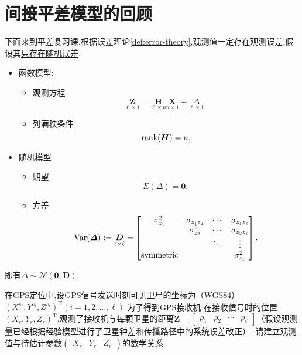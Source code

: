 \documentclass[cn,10pt,citestyle=gb7714-2015,bibstyle=gb7714-2015]{elegantbook}
\newcommand{\mT}{\mathrm{T}}
\renewcommand{\l}{\ell}
\newcommand{\rank}{\textup{rank}}
\newcommand{\Var}{\textup{Var}}
\begin{document}
\section{间接平差模型的回顾}
下面来到平差复习课,根据误差理论\ref{def:error-theory},观测值一定存在观测误差,假设其\uline{只存在随机误差}.
\begin{proposition}[间接平差的函数模型和随机模型]\label{pro:GM-adjust-model}
  \begin{itemize}
    \item 函数模型:
    \begin{itemize}
      \item 观测方程
      \begin{equation}\label{eq:GM-equation}
        \underset{\l\times 1}{\bm{Z}}=\underset{\l\times n}{\bm{H}}\underset{n\times 1}{\bm{X}}+\underset{\l\times 1}{\bm{\varDelta}},
      \end{equation}
      \item 列满秩条件
      \begin{equation}
        \rank(\bm{H})=n,
      \end{equation}
    \end{itemize}
    \item 随机模型
    \begin{itemize}
      \item 期望
      \begin{equation}
        E(\bm{\varDelta})=\bm{0},
      \end{equation}
      \item 方差
      \begin{equation}
        \Var(\bm{\varDelta}):=\underset{\l\times\l}{\bm{D}}=\begin{bmatrix}
          \sigma_{z_1}^2&\sigma_{z_1z_2}&\cdots&\sigma_{z_1z_\l}\\
           &\sigma_{z_2}^2&\cdots&\sigma_{z_2z_\l}\\
           & &\ddots&\vdots\\
          \textup{symmetric}& & &\sigma_{z_\l}^2
        \end{bmatrix}.
      \end{equation}
    \end{itemize}
  \end{itemize}
\end{proposition}
\begin{remark}
  即有$\bm{\varDelta}\sim\mathcal{N}(\bm{0},\bm{D})$.
\end{remark}
\begin{example}\label{ex:GPS}
  在\textup{GPS}定位中,设\textup{GPS}信号发送时刻可见卫星的坐标为（\textup{WGS84}）
  $(X^{s_i},Y^{s_i},Z^{s_i})^\mT$$(i=1,2,\ldots,\l)$.为了得到\textup{GPS}接收机
  在接收信号时的位置$(X_r,Y_r,Z_r)^\mT$,观测了接收机与每颗卫星的距离$\bm{Z}=\begin{bmatrix}
    \rho_1&\rho_2&\cdots&\rho_\l
  \end{bmatrix}$（假设观测量已经根据经验模型进行了卫星钟差和传播路径中的系统误差改正）.
  请建立观测值与待估计参数$\begin{pmatrix}
    X_r&Y_r&Z_r
  \end{pmatrix}$的数学关系.
\end{example}  
\end{document}
